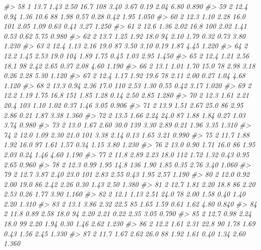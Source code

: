 \documentclass[]{book}
\newenvironment{Shaded}{\begin{snugshade}}{\end{snugshade}}
\newcommand{\CommentTok}[1]{\textcolor[rgb]{0.56,0.35,0.01}{\textit{#1}}}
\begin{document}
\begin{Shaded}
\begin{Highlighting}[]
\CommentTok{#> 58   1   13.7  1.43  2.50  16.7  108 3.40  3.67 0.19  2.04  6.80 0.890}
\CommentTok{#> 59   2   12.4  0.94  1.36  10.6   88 1.98  0.57 0.28  0.42  1.95 1.050}
\CommentTok{#> 60   2   12.3  1.10  2.28  16.0  101 2.05  1.09 0.63  0.41  3.27 1.250}
\CommentTok{#> 61   2   12.6  1.36  2.02  16.8  100 2.02  1.41 0.53  0.62  5.75 0.980}
\CommentTok{#> 62   2   13.7  1.25  1.92  18.0   94 2.10  1.79 0.32  0.73  3.80 1.230}
\CommentTok{#> 63   2   12.4  1.13  2.16  19.0   87 3.50  3.10 0.19  1.87  4.45 1.220}
\CommentTok{#> 64   2   12.2  1.45  2.53  19.0  104 1.89  1.75 0.45  1.03  2.95 1.450}
\CommentTok{#> 65   2   12.4  1.21  2.56  18.1   98 2.42  2.65 0.37  2.08  4.60 1.190}
\CommentTok{#> 66   2   13.1  1.01  1.70  15.0   78 2.98  3.18 0.26  2.28  5.30 1.120}
\CommentTok{#> 67   2   12.4  1.17  1.92  19.6   78 2.11  2.00 0.27  1.04  4.68 1.120}
\CommentTok{#> 68   2   13.3  0.94  2.36  17.0  110 2.53  1.30 0.55  0.42  3.17 1.020}
\CommentTok{#> 69   2   12.2  1.19  1.75  16.8  151 1.85  1.28 0.14  2.50  2.85 1.280}
\CommentTok{#> 70   2   12.3  1.61  2.21  20.4  103 1.10  1.02 0.37  1.46  3.05 0.906}
\CommentTok{#> 71   2   13.9  1.51  2.67  25.0   86 2.95  2.86 0.21  1.87  3.38 1.360}
\CommentTok{#> 72   2   13.5  1.66  2.24  24.0   87 1.88  1.84 0.27  1.03  3.74 0.980}
\CommentTok{#> 73   2   13.0  1.67  2.60  30.0  139 3.30  2.89 0.21  1.96  3.35 1.310}
\CommentTok{#> 74   2   12.0  1.09  2.30  21.0  101 3.38  2.14 0.13  1.65  3.21 0.990}
\CommentTok{#> 75   2   11.7  1.88  1.92  16.0   97 1.61  1.57 0.34  1.15  3.80 1.230}
\CommentTok{#> 76   2   13.0  0.90  1.71  16.0   86 1.95  2.03 0.24  1.46  4.60 1.190}
\CommentTok{#> 77   2   11.8  2.89  2.23  18.0  112 1.72  1.32 0.43  0.95  2.65 0.960}
\CommentTok{#> 78   2   12.3  0.99  1.95  14.8  136 1.90  1.85 0.35  2.76  3.40 1.060}
\CommentTok{#> 79   2   12.7  3.87  2.40  23.0  101 2.83  2.55 0.43  1.95  2.57 1.190}
\CommentTok{#> 80   2   12.0  0.92  2.00  19.0   86 2.42  2.26 0.30  1.43  2.50 1.380}
\CommentTok{#> 81   2   12.7  1.81  2.20  18.8   86 2.20  2.53 0.26  1.77  3.90 1.160}
\CommentTok{#> 82   2   12.1  1.13  2.51  24.0   78 2.00  1.58 0.40  1.40  2.20 1.310}
\CommentTok{#> 83   2   13.1  3.86  2.32  22.5   85 1.65  1.59 0.61  1.62  4.80 0.840}
\CommentTok{#> 84   2   11.8  0.89  2.58  18.0   94 2.20  2.21 0.22  2.35  3.05 0.790}
\CommentTok{#> 85   2   12.7  0.98  2.24  18.0   99 2.20  1.94 0.30  1.46  2.62 1.230}
\CommentTok{#> 86   2   12.2  1.61  2.31  22.8   90 1.78  1.69 0.43  1.56  2.45 1.330}
\CommentTok{#> 87   2   11.7  1.67  2.62  26.0   88 1.92  1.61 0.40  1.34  2.60 1.360}

\end{Highlighting}
\end{Shaded}
\end{document}
